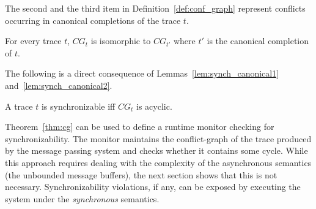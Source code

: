 The second and the third item in Definition~\ref{def:conf_graph} represent conflicts occurring in canonical completions of the trace $t$.

\begin{lemma}\label{lem:synch_canonical2}
For every trace $t$, $CG_t$ is isomorphic to $CG_{t'}$ where $t'$ is the canonical completion of $t$.
\end{lemma}

The following is a direct consequence of Lemmas~\ref{lem:synch_canonical1} and~\ref{lem:synch_canonical2}.

\begin{theorem}\label{thm:cg} 
A trace $t$ is synchronizable if{f} $CG_t$ is acyclic.
\end{theorem}
%
%

Theorem~\ref{thm:cg} can be used to define a runtime monitor checking for synchronizability. 
The monitor maintains the conflict-graph of the trace produced by the message passing system and checks whether it contains some cycle. 
While this approach requires dealing with the complexity of the asynchronous semantics (the unbounded message buffers), the next section shows that this is not necessary. Synchronizability violations, if any, can be exposed by executing the system under the \emph{synchronous} semantics.


